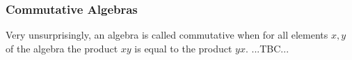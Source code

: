 

\subsubsection{Commutative Algebras}
Very unsurprisingly, an algebra is called commutative when for all elements $x,y$ of the algebra the product $xy$ is equal to the product $yx$. ...TBC...





